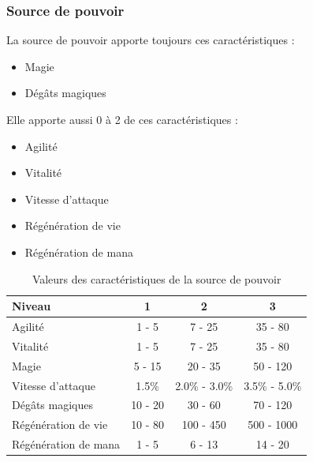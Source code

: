 \documentclass[11pt, a4paper, oneside]{report}
\begin{document}
\subsubsection{Source de pouvoir}
La source de pouvoir apporte toujours ces caractéristiques :
\begin{multicols}{2}
\begin{itemize}
	\item Magie
	\item Dégâts magiques
\end{itemize}
\end{multicols}
Elle apporte aussi 0 à 2 de ces caractéristiques :
\begin{multicols}{2}
\begin{itemize}
    \item Agilité
    \item Vitalité
    \item Vitesse d'attaque
    \item Régénération de vie
    \item Régénération de mana
\end{itemize}
\end{multicols}
\begin{table}[ht]
\begin{center}
\begin{tabular}{| l | c | c | c |}
  \hline      
  Niveau 				& 1 & 2 & 3\\ \hline \hline
  Agilité 				& 1 - 5 & 7 - 25 & 35 - 80\\ \hline
  Vitalité 				& 1 - 5 & 7 - 25 & 35 - 80\\ \hline
  Magie 				& 5 - 15 & 20 - 35 & 50 - 120\\ \hline
  Vitesse d'attaque 	& 1.5\% & 2.0\% - 3.0\% & 3.5\% - 5.0\%\\ \hline
  Dégâts magiques 		& 10 - 20 & 30 - 60 & 70 - 120\\ \hline
  Régénération de vie 	& 10 - 80  & 100 - 450 & 500 - 1000\\ \hline
  Régénération de mana 	& 1 - 5  & 6 - 13 & 14 - 20\\ \hline
\end{tabular}
\caption{Valeurs des caractéristiques de la source de pouvoir}
\end{center}
\end{table}
\end{document}
